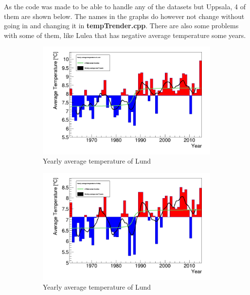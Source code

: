As the code was made to be able to handle any of the datasets but Uppsala, 4 of them are shown below. The names in the graphs do however not change without going in and changing it in \textbf{tempTrender.cpp}. There are also some problems with some of them, like Lulea that has negative average temperature some years.
\begin{figure}
	\centering
	\begin{subfigure}[b]{0.49\lidwidth}
		\includegraphics[width=\linewidth]{yearAvg_Lund.png}
		\caption{Yearly average temperature of Lund}
		\label{Lund}
	\end{subfigure}
	\begin{subfigure}[b]{0.49\lidwidth}
		\includegraphics[width=14cm]{yearAvg_Visby.png}
		\caption{Yearly average temperature of Lund}
		\label{Visby}
	\end{subfigure}
	\begin{subfigure}[b]{0.49\lidwidth}

\end{subfigure}
\end{figure}
